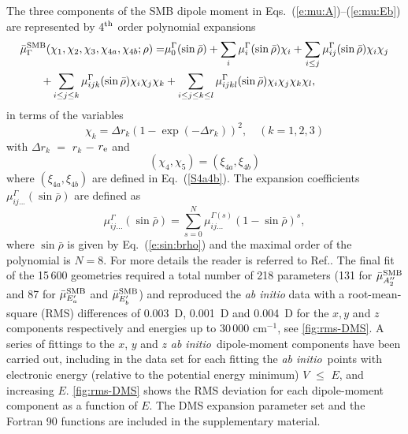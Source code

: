 \documentclass{achemso}
\renewcommand{\eqref}[1]{(\ref{#1})}
\newcommand{\3}{$_{3}$}
\newcommand{\pp}{^{\prime\prime}}
\newcommand{\ai}{\textit{ab initio}}
\begin{document}
The three components of the SMB dipole moment
in Eqs.~(\ref{e:mu:A})--(\ref{e:mu:Eb}) are
 represented by 4$^{\rm th}$ order polynomial expansions
\begin{equation}\label{eq:dms_expansion}
\begin{aligned}
\bar{\mu}_\Gamma^{\rm SMB}
(\chi_1,\chi_2,\chi_3,\chi_{4a},\chi_{4b};\rho)= & \mu_0^{\Gamma}(\sin\bar\rho)+\sum_{i}\mu_i^{\Gamma}(\sin\bar\rho)\chi_i + \sum_{i\le j}\mu_{ij}^{\Gamma}(\sin\bar\rho)\chi_i\chi_j\\ + \sum_{i\le j\le k}\mu_{ijk}^{\Gamma}(\sin\bar\rho)\chi_i\chi_j\chi_k
 & + \sum_{i\le j\le k\le l}\mu_{ijkl}^{\Gamma}(\sin\bar\rho)\chi_i\chi_j\chi_k\chi_l ,
\end{aligned}
\end{equation}
in terms of the variables
\begin{equation}
\label{eq:mu:icoord1}
\chi_k = \Delta r_k (1-\exp(-\Delta r_k))^2, \quad (k=1,2,3)
\end{equation}
with $\Delta r_k$ $=$ $r_k$ $-$ $r_{\rm e}$
and
\begin{equation}
\label{eq:mu:icoord2}
( \chi_{4}, \chi_{5} ) =
( \xi_{4a}, \xi_{4b} )
\end{equation} where
$( \xi_{4a}, \xi_{4b} ) $ are defined in Eq.~\eqref{S4a4b}.
The expansion coefficients $\mu^\Gamma_{ij...} (\sin\bar\rho)$ are defined as
\begin{equation}
 \mu^\Gamma_{ij...}(\sin\bar\rho)=\sum_{s=0}^N\mu^{\Gamma(s)}_{ij...}(1-\sin\bar\rho)^s,
\end{equation}
where $\sin {\bar \rho} $ is given by Eq.~\eqref{e:sin:brho} and
the maximal order of the polynomial is $N=8$.
For more details the reader is referred to  Ref..
The final fit of the 15\,600  geometries required a total number of 218  parameters
(131 for
  $\bar\mu_{A_2\pp}^{\rm SMB}$
 and 87 for
  $\bar\mu_{E_a'}^{\rm SMB}$ and
  $\bar\mu_{E_b'}^{\rm SMB}$)
 and reproduced the \textit{ab initio} data with a root-mean-square (RMS) differences of 0.003~D, 0.001~D and 0.004~D for the $x,y$ and $z$ components respectively and  energies up to 30\,000 cm$^{-1}$, see \ref{fig:rms-DMS}. A series of fittings to the $x$, $y$ and $z$ \ai\ dipole-moment components have been carried out, including in the data set for each fitting the \ai\ points with
electronic energy (relative to the potential energy minimum) $V$ $\leqslant$ $E$, and increasing $E$. \ref{fig:rms-DMS} shows the RMS deviation for each dipole-moment component as a function of $E$.
The DMS expansion parameter set and the Fortran 90 functions are included in the supplementary material.
\end{document}
